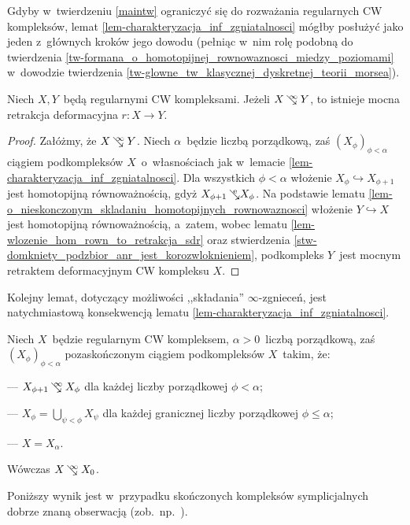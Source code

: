 Gdyby w~twierdzeniu \ref{maintw} ograniczyć się do rozważania regularnych CW kompleksów, lemat \ref{lem-charakteryzacja_inf_zgniatalnosci} mógłby posłużyć jako jeden z~głównych kroków jego dowodu (pełniąc w~nim rolę podobną do twierdzenia \ref{tw-formana_o_homotopijnej_rownowaznosci_miedzy_poziomami} w~dowodzie twierdzenia \ref{tw-glowne_tw_klasycznej_dyskretnej_teorii_morsea}).

\begin{lem}\label{lem-niesk_zgniatalnosc_mocny_retrakt_deformacyjny}
Niech $X, Y$~będą regularnymi CW kompleksami. Jeżeli $X\infcoll Y$, to istnieje mocna retrakcja deformacyjna $r\colon X\to Y$. 
\end{lem}
\begin{proof}
Załóżmy, że $X\infcoll Y$. Niech $\alpha$~będzie liczbą porządkową, zaś $\left(X_\phi\right)_{\phi<\alpha}$ ciągiem podkompleksów $X$~o~własnościach jak w~lemacie \ref{lem-charakteryzacja_inf_zgniatalnosci}. Dla wszystkich $\phi<\alpha$ włożenie $X_\phi\hookrightarrow X_{\phi+1}$ jest homotopijną równoważnością, gdyż $X_{\phi+1}\mbox{$\hspace{2pt}\searrow\hspace{-9pt}^\mathrm{e}\hspace{2pt}$} X_\phi$. Na podstawie lematu \ref{lem-o_nieskonczonym_skladaniu_homotopijnych_rownowaznosci} włożenie $Y\hookrightarrow X$ jest homotopijną równoważnością, a~zatem, wobec  lematu \ref{lem-wlozenie_hom_rown_to_retrakcja_sdr} oraz  stwierdzenia \ref{stw-domkniety_podzbior_anr_jest_korozwloknieniem}, podkompleks $Y$~jest mocnym retraktem deformacyjnym CW kompleksu $X$.
\end{proof}

Kolejny lemat, dotyczący możliwości ,,składania'' $\infty$-zgnieceń, jest natychmiastową konsekwencją lematu \ref{lem-charakteryzacja_inf_zgniatalnosci}.

\begin{lem}\label{lem-ciag_wstepujacy_zgniecen}
Niech $X$~będzie regularnym CW kompleksem, $\alpha>0$~liczbą porządkową, zaś $(X_\phi)_{\phi<\alpha}$ pozaskończonym ciągiem podkompleksów $X$~takim, że:
\begin{compactitem}
\item[---] $X_{\phi+1}\infcoll X_{\phi}$ dla każdej liczby porządkowej $\phi<\alpha$;
\item[---] $X_{\phi}=\bigcup_{\psi<\phi} X_{\psi}$ dla każdej granicznej liczby porządkowej $\phi\leq\alpha$;
\item[---] $X=X_\alpha$.
\end{compactitem}
Wówczas $X\infcoll X_0$. 
\end{lem}

Poniższy wynik jest w~przypadku skończonych kompleksów symplicjalnych dobrze znaną obserwacją (zob.~np.~\cite{Kahn84}).

